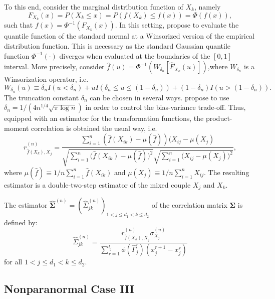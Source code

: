 To this end, consider the marginal distribution function of $X_k$, namely \[F_{X_k}(x)=P(X_k \leq x) = P(f(X_k) \leq f(x)) = \Phi(f(x)),\] such that $f(x) = \Phi^{-1}(F_{X_k}(x))$. In this setting, \citet{Liu09} propose to evaluate the quantile function of the standard normal at a Winsorized version of the empirical distribution function. This is necessary as the standard Gaussian quantile function $\Phi^{-1}(\cdot)$ diverges when evaluated at the boundaries of the $[0,1]$ interval. More precisely, consider $\hat{f}(u) = \Phi^{-1}(W_{\delta_n}[\hat{F}_{X_k}(u)])$,where $W_{\delta_n}$ is a Winsorization operator, i.e. \[W_{\delta_n}(u) \equiv \delta_n I(u < \delta_n) + u I(\delta_n \leq u \leq (1-\delta_n)) + (1-\delta_n) I(u > (1-\delta_n)).\] The truncation constant $\delta_n$ can be chosen in several ways.
\citet{Liu09} propose to use $\delta_n = 1/(4n^{1/4}\sqrt{\pi\log n})$ in order to control the bias-variance trade-off. Thus, equipped with an estimator for the transformation functions, the product-moment correlation is obtained the usual way, i.e.
\begin{equation*}
    r^{(n)}_{\hat{f}(X_k),X_j} = \frac{\sum_{i=1}^n (\hat{f}(X_{ik}) - \mu(\hat{f}))(X_{ij} - \mu(X_j)}{\sqrt{\sum_{i=1}^n \Big(\hat{f}(X_{ik}) - \mu(\hat{f})\Big)^2}\sqrt{\sum_{i=1}^n \Big(X_{ij} - \mu(X_j)\Big)^2}},
\end{equation*}
where $\mu(\hat{f}) \equiv 1/n\sum_{i=1}^n \hat{f}(X_{ik})$ and $\mu(X_j) \equiv 1/n\sum_{i=1}^n X_{ij}$. The resulting estimator is a double-two-step estimator of the mixed couple $X_j$ and $X_k$.
\begin{definition}
    The estimator $\hat{\mathbf{\Sigma}}^{(n)} = (\hat{\Sigma}_{jk}^{(n)})_{1 < j \leq d_1 < k \leq d_2}$ of the correlation matrix $\mathbf{\Sigma}$ is defined by:
\begin{equation}
    \hat{\Sigma}_{jk}^{(n)} = \frac{r^{(n)}_{\hat{f}(X_k),X_j} \sigma^{(n)}_{X_j}}{\sum_{r=1}^{l_{j}} \phi(\hat{\Gamma}_j^r)(x_j^{r+1} - x_j^r)}
\end{equation}
    for all $1 < j \leq d_1 < k \leq d_2$.
\end{definition}



\subsection{Nonparanormal Case III}\label{sec::nonparanormal_case3}

